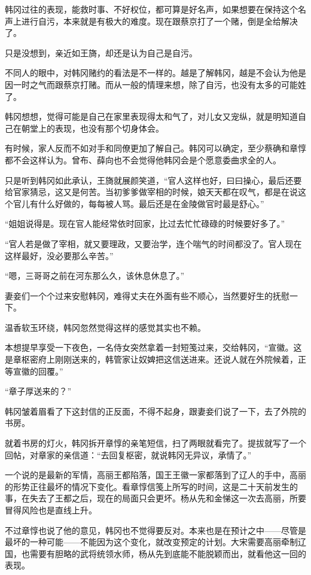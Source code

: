 韩冈过往的表现，能救时事、不好权位，都可算是好名声，如果想要在保持这个名声上进行自污，本来就是有极大的难度。现在跟蔡京打了一个赌，倒是全给解决了。

只是没想到，亲近如王旖，却还是认为自己是自污。

不同人的眼中，对韩冈赌约的看法是不一样的。越是了解韩冈，越是不会认为他是因一时之气而跟蔡京打赌。而从一般的情理来想，除了自污，也没有太多的可能姓了。

韩冈想想，觉得可能是自己在家里表现得太和气了，对儿女又宠纵，就是明知道自己在朝堂上的表现，也没有那个切身体会。

有时候，家人反而不如对手和同僚更加了解自己。韩冈可以确定，至少蔡确和章惇都不会这样认为。曾布、薛向也不会觉得他韩冈会是个愿意委曲求全的人。

只是听到韩冈如此承认，王旖就展颜笑道，“官人这样也好，曰曰操心，最后还要给官家猜忌，这又是何苦。当初爹爹做宰相的时候，娘天天都在叹气，都是在说这个官儿有什么好做的，每每被人骂。最后还是在金陵做官时最是舒心。”

“姐姐说得是。现在官人能经常依时回家，比过去忙忙碌碌的时候要好多了。”

“官人若是做了宰相，就又要理政，又要治学，连个喘气的时间都没了。官人现在这样最好，没必要那么辛苦。”

“嗯，三哥哥之前在河东那么久，该休息休息了。”

妻妾们一个个过来安慰韩冈，难得丈夫在外面有些不顺心，当然要好生的抚慰一下。

温香软玉环绕，韩冈忽然觉得这样的感觉其实也不赖。

本想提早享受一下夜色，一名侍女突然拿着一封短笺过来，交给韩冈，“宣徽。这是章枢密府上刚刚送来的，韩管家让奴婢把这信送进来。还说人就在外院候着，正等宣徽的回覆。”

“章子厚送来的？”

韩冈皱着眉看了下这封信的正反面，不得不起身，跟妻妾们说了一下，去了外院的书房。

就着书房的灯火，韩冈拆开章惇的亲笔短信，扫了两眼就看完了。提拔就写了一个回帖，对章家的亲信道：“去回复枢密，就说韩冈无异议，承情了。”

一个说的是最新的军情，高丽王都陷落，国王王徽一家都落到了辽人的手中，高丽的形势正往最坏的情况下变化。看章惇信笺上所写的时间，这是二十天前发生的事，在失去了王都之后，现在的局面只会更坏。杨从先和金悌这一次去高丽，所要冒得风险也是直线上升。

不过章惇也说了他的意见，韩冈也不觉得要反对。本来也是在预计之中——尽管是最坏的一种可能——不能因为这个变化，就改变预定的计划。大宋需要高丽牵制辽国，也需要有胆略的武将统领水师，杨从先到底能不能脱颖而出，就看他这一回的表现。

